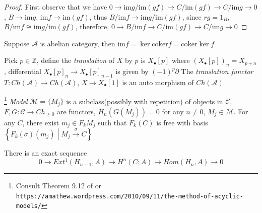 \documentclass[main]{subfiles}
\begin{document}
\begin{proof}
First observe that we have $0\to \mathrm{im}g/\mathrm{im}(gf)\to C/\mathrm{im}(gf)\to C/\mathrm{im}g\to0$, $B\to\mathrm{im}g$, $\mathrm{im}f\to\mathrm{im}(gf)$, thus $B/\mathrm{im}f\to\mathrm{im}g/\mathrm{im}(gf)$, since $rg=1_B$, $B/\mathrm{im}f\cong\mathrm{im}g/\mathrm{im}(gf)$, therefore, $0\to B/\mathrm{im}f\to C/\mathrm{im}(gf)\to C/\mathrm{im}g\to0$
\end{proof}

\begin{lemma}
Suppose $\mathscr A$ is abelian category, then $\mathrm{im}f=\ker\mathrm{coker}f=\mathrm{coker}\ker f$
\end{lemma}

\begin{definition}
Pick $p\in\mathbb Z$, define the \textit{translation} of $X$ by $p$ is $X_\bullet[p]$ where $(X_\bullet[p])_n=X_{p+n}$, differential $X_\bullet[p]_n\to X_\bullet[p]_{n-1}$ is given by $(-1)^p\partial$
The \textit{translation functor} $T:Ch(\mathscr A)\to Ch(\mathscr A)$, $X\mapsto X_\bullet[1]$ is an auto morphism of $Ch(\mathscr A)$
\end{definition}

\begin{theorem}\label{Acyclic model theorem}\footnote{Consult Theorem 9.12 of \cite{AnIntroductionToAlgebraicTopologyJosephJRotman} or \texttt{https://amathew.wordpress.com/2010/09/11/the-method-of-acyclic-models/}}
\textit{Model} $\mathcal M=\{M_j\}$ is a subclass(possibly with repetition) of objects in $\mathscr C$, $F,G:\mathscr C\to Ch_{\geq0}$ are functors, $H_n(G(M_j))=0$ for any $n\neq0$, $M_j\in\mathcal M$. For any $C$, there exist $m_j\in F_kM_j$ such that $F_k(C)$ is free with basis $\left\{F_k(\sigma)(m_j)\middle|M_j\xrightarrow{\sigma} C\right\}$
\end{theorem}

\begin{theorem}\label{Universal coefficient theorem for cohomology}
There is an exact sequence
\[0\to Ext^1(H_{n-1},A)\to H^n(C;A)\to Hom(H_n,A)\to0\]
\end{theorem}
\end{document}
